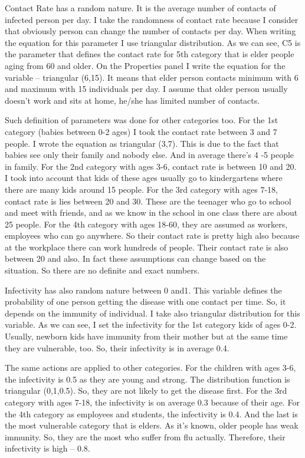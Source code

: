 Contact Rate has a random nature. It is the average number of contacts of infected person per day. I take the randomness of contact rate because I consider that obviously person can change the number of contacts per day. When writing the equation for this parameter I use triangular distribution. As we can see, C5 is the parameter that defines the contact rate for 5th category that is elder people aging from 60 and older. On the Properties panel I write the equation for the variable – triangular (6,15). It means that elder person contacts minimum with 6 and maximum with 15 individuals per day. I assume that older person usually doesn’t work and sits at home, he/she has limited number of contacts.

Such definition of parameters was done for other categories too. For the 1st category (babies between 0-2 ages) I took the contact rate between 3 and 7 people. I wrote the equation as triangular (3,7). This is due to the fact that babies see only their family and nobody else. And in average there’s 4 -5 people in family. For the 2nd category with ages 3-6, contact rate is between 10 and 20. I took into account that kids of these ages usually go to kindergartens where there are many kids around 15 people. For the 3rd category with ages 7-18, contact rate is lies between 20 and 30. These are the teenager who go to school and meet with friends, and as we know in the school in one class there are about 25 people. For the 4th category with ages 18-60, they are assumed as workers, employees who can go anywhere. So their contact rate is pretty high also because at the workplace there can work hundreds of people. Their contact rate is also between 20 and also. In fact these assumptions can change based on the situation. So there are no definite and exact numbers.

Infectivity has also random nature between 0 and1. This variable defines the probability of one person getting the disease with one contact per time. So, it depends on the immunity of individual. I take also triangular distribution for this variable. As we can see, I set the infectivity for the 1st category kids of ages 0-2. Usually, newborn kids have immunity from their mother but at the same time they are vulnerable, too. So, their infectivity is in average 0.4.

The same actions are applied to other categories. For the children with ages 3-6, the infectivity is 0.5 as they are young and strong. The distribution function is triangular (0,1,0.5). So, they are not likely to get the disease first. For the 3rd category with ages 7-18, the infectivity is on average 0.3 because of their age. For the 4th category as employees and students, the infectivity is 0.4. And the last is the most vulnerable category that is elders. As it’s known, older people has weak immunity. So, they are the most who suffer from flu actually. Therefore, their infectivity is high – 0.8.

